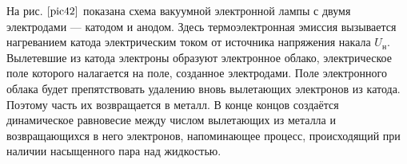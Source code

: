 \documentclass[a4paper,10pt]{book}
\begin{document}
На рис. $\ref{pic42}$ показана схема вакуумной электронной лампы с двумя электродами — катодом и анодом. Здесь термоэлектронная эмиссия вызывается нагреванием катода электрическим током от источника напряжения накала $U_\text{н}$. Вылетевшие из катода электроны образуют электронное облако, электрическое поле которого налагается на поле, созданное электродами. Поле электронного облака будет препятствовать удалению вновь вылетающих электронов из катода. Поэтому часть их возвращается в металл. В конце концов создаётся динамическое равновесие между числом вылетающих из металла и возвращающихся в него электронов, напоминающее процесс, происходящий при наличии насыщенного пара над жидкостью.
\begin{figure}[h]
	\caption{}
	\label{pic44}
\end{figure}
\end{document}
